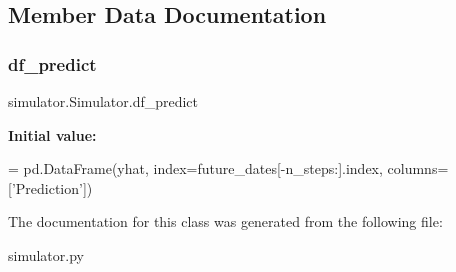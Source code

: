 \subsection{Member Data Documentation}
\mbox{\label{classsimulator_1_1Simulator_a5c72ce9d4fc4bc35695c12265a05a645}} 
\subsubsection{\texorpdfstring{df\+\_\+predict}{df\_predict}}
{\footnotesize\ttfamily simulator.\+Simulator.\+df\+\_\+predict\hspace{0.3cm}{\ttfamily [static]}}

{\bfseries Initial value\+:}
\begin{DoxyCode}
=  pd.DataFrame(yhat,
                              index=future\_dates[-n\_steps:].index, columns=[\textcolor{stringliteral}{'Prediction'}])
\end{DoxyCode}


The documentation for this class was generated from the following file\+:\begin{DoxyCompactItemize}
\item 
simulator.\+py\end{DoxyCompactItemize}
